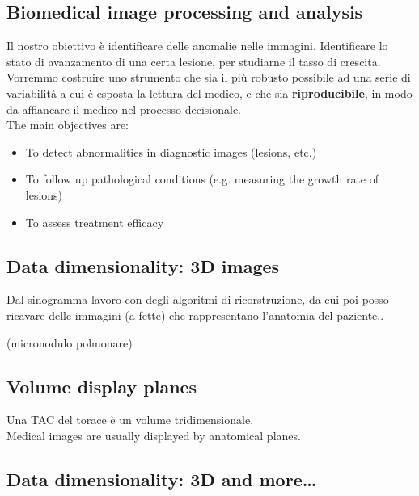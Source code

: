 \subsection{Biomedical image processing and analysis}

Il nostro obiettivo è identificare delle anomalie nelle immagini. Identificare lo stato di avanzamento di una certa lesione, per studiarne il tasso di crescita.\\
Vorremmo costruire uno strumento che sia il più robusto possibile ad una serie di variabilità a cui è esposta la lettura del medico, e che sia \textbf{riproducibile}, in modo da affiancare il medico nel processo decisionale.\\

The main objectives are:
\begin{itemize}
	\item To detect abnormalities in diagnostic images (lesions, etc.)
	\item To follow up pathological conditions (e.g. measuring the growth rate of lesions)
	\item To assess treatment efficacy
\end{itemize}


\subsection{Data dimensionality: 3D images}

Dal sinogramma lavoro con degli algoritmi di ricorstruzione, da cui poi posso ricavare delle immagini (a fette) che rappresentano l'anatomia del paziente..

(micronodulo polmonare)\\

\subsection{Volume display planes}
Una TAC del torace è un volume tridimensionale.\\

Medical images are usually displayed by anatomical planes.

\subsection{Data dimensionality: 3D and more…}

